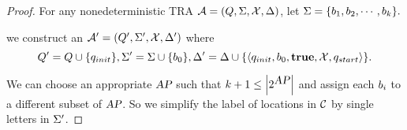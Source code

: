 \begin{proof}
For any nonedeterministic TRA $\mathcal{A} = (Q,\Sigma,\mathcal{X},\Delta)$, let $\Sigma = \{b_{1}, b_{2}, \cdots, b_{k}\}.$

we construct an $\mathcal{A}' = (Q', \Sigma', \mathcal{X}, \Delta')$ where
$$
    Q'   = Q  \cup \{ q_{init } \},
    \Sigma'  = \Sigma \cup \{ b_{0} \},
    \Delta'     = \Delta    \cup \{ \langle
            q_{init },
            b_{0},
            \mathbf{true},
            \mathcal{X},
            q_{start}
        \rangle
    \}.
$$

We can choose an appropriate $\mbox{\sl AP}$ such that $ k + 1 \le \left| 2^{\mbox{\sl AP}} \right| $ 
and assign each $b_{i}$ to a different subset of $\mbox{\sl AP}$. So we simplify the label 
of locations in $\mathcal{C}$ by single letters in $\Sigma'$.


\end{proof}
